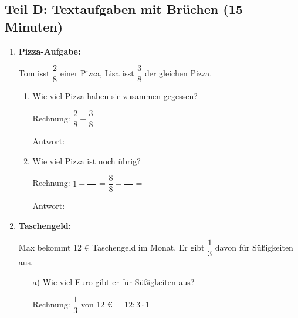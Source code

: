 \subsection*{Teil D: Textaufgaben mit Brüchen (15 Minuten)}

\begin{enumerate}[resume, label=\arabic*.]
    \item \textbf{Pizza-Aufgabe:} 

    Tom isst $\dfrac{2}{8}$ einer Pizza, Lisa isst $\dfrac{3}{8}$ der gleichen Pizza.

    \begin{enumerate}[label=\alph*)]
        \item Wie viel Pizza haben sie zusammen gegessen?

            \vspace{0.3cm}
            Rechnung: $\dfrac{2}{8} + \dfrac{3}{8}$ = \underline{\hspace{6cm}}

            \vspace{0.3cm}
            Antwort: \underline{\hspace{10cm}}

            \vspace{0.5cm}
        \item Wie viel Pizza ist noch übrig?

            \vspace{0.3cm}
            Rechnung: $1 - \dfrac{\phantom{00}}{\phantom{00}}$ = $\dfrac{8}{8} - \dfrac{\phantom{00}}{\phantom{00}}$ = \underline{\hspace{5cm}}

            \vspace{0.3cm}
            Antwort: \underline{\hspace{10cm}}
    \end{enumerate}

    \vspace{0.8cm}

    \item \textbf{Taschengeld:} 

    Max bekommt 12 $€$ Taschengeld im Monat. Er gibt $\dfrac{1}{3}$ davon für Süßigkeiten aus.

    \vspace{0.5cm}
    \begin{itemize}
        \item[a)] Wie viel Euro gibt er für Süßigkeiten aus?

        \vspace{0.3cm}
        Rechnung: $\dfrac{1}{3}$ von 12 € = $12 : 3 \cdot 1$ = \underline{\hspace{5cm}}


\end{itemize}
\end{enumerate}
